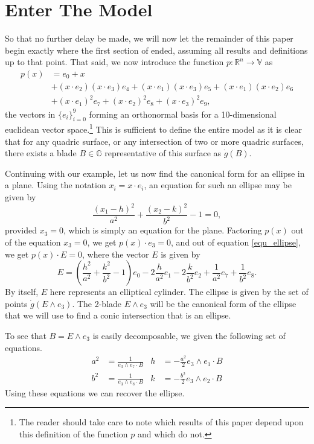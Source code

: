 \documentclass{birkjour}
\theoremstyle{definition}
\theoremstyle{remark}
\numberwithin{equation}{section}
\newcommand{\R}{\mathbb{R}}
\newcommand{\G}{\mathbb{G}}
\newcommand{\V}{\mathbb{V}}
\newcommand{\gd}{\dot{g}}
\begin{document}
\section{Enter The Model}

So that no further delay be made, we will now let the remainder of this paper begin
exactly where the first section of \cite{} ended, assuming all results and definitions up to that point.
That said, we now introduce the function $p:\R^n\to\V$ as
\begin{align*}
p(x) &= e_0 + x \\
 &+ (x\cdot e_2)(x\cdot e_3)e_4 + (x\cdot e_1)(x\cdot e_3)e_5 + (x\cdot e_1)(x\cdot e_2)e_6 \\
 &+ (x\cdot e_1)^2e_7 + (x\cdot e_2)^2e_8 + (x\cdot e_3)^2 e_9,
\end{align*}
the vectors in $\{e_i\}_{i=0}^9$ forming an orthonormal basis for a 10-dimensional
euclidean vector space.\footnote{The reader should take care to note which results of this paper
depend upon this definition of the function $p$ and which do not.}
This is sufficient to define the entire model as it is clear that for any quadric
surface, or any intersection of two or more quadric surfaces, there exists a blade
$B\in\G$ representative of this surface as $\gd(B)$.

Continuing with our example, let us now find the canonical form for an ellipse
in a plane.  Using the notation $x_i = x\cdot e_i$, an equation for such an ellipse
may be given by
\begin{equation}\label{equ_ellipse}
\frac{(x_1-h)^2}{a^2} + \frac{(x_2-k)^2}{b^2} - 1 = 0,
\end{equation}
provided $x_3=0$, which is simply an equation for the plane.
Factoring $p(x)$ out of the equation $x_3=0$, we get $p(x)\cdot e_3=0$,
and out of equation \eqref{equ_ellipse}, we get $p(x)\cdot E=0$, where the
vector $E$ is given by
\begin{equation*}
E = \left(\frac{h^2}{a^2} + \frac{k^2}{b^2} - 1\right)e_0 -
  2\frac{h}{a^2}e_1 - 2\frac{k}{b^2}e_2 + \frac{1}{a^2}e_7 + \frac{1}{b^2}e_8.
\end{equation*}
By itself, $E$ here represents an elliptical cylinder.  The ellipse is given by
the set of points $\gd(E\wedge e_3)$.  The 2-blade $E\wedge e_3$ will be the
canonical form of the ellipse that we will use to find a conic intersection that
is an ellipse.

To see that $B=E\wedge e_3$ is easily decomposable, we given the following set of
equations.
\begin{align*}
a^2 &= \frac{1}{e_3\wedge e_7\cdot B} &
h &= -\frac{a^2}{2}e_3\wedge e_1\cdot B \\
b^2 &= \frac{1}{e_3\wedge e_8\cdot B} &
k &= -\frac{b^2}{2}e_3\wedge e_2\cdot B
\end{align*}
Using these equations we can recover the ellipse.
\end{document}
